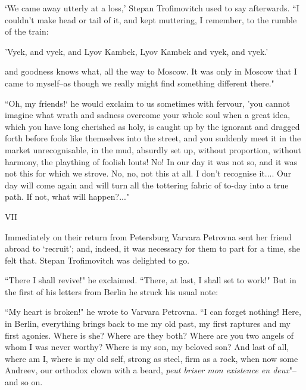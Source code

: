 \documentclass[12pt]{article}
\begin{document}
\vspace{12pt}
`We came away utterly at a loss,' Stepan Trofimovitch used to say
afterwards. ``I couldn't make head or tail of it, and kept muttering, I
remember, to the rumble of the train:


\vspace{12pt}
     'Vyek, and vyek, and Lyov Kambek,
     Lyov Kambek and vyek, and vyek.'


\vspace{12pt}
and goodness knows what, all the way to Moscow. It was only in Moscow
that I came to myself--as though we really might find something
different there."


\vspace{12pt}
``Oh, my friends!` he would exclaim to us sometimes with fervour, 'you
cannot imagine what wrath and sadness overcome your whole soul when a
great idea, which you have long cherished as holy, is caught up by the
ignorant and dragged forth before fools like themselves into the street,
and you suddenly meet it in the market unrecognisable, in the mud,
absurdly set up, without proportion, without harmony, the plaything of
foolish louts! No! In our day it was not so, and it was not this for
which we strove. No, no, not this at all. I don't recognise it.... Our
day will come again and will turn all the tottering fabric of to-day
into a true path. If not, what will happen?..."



\vspace{12pt}
VII


\vspace{12pt}
Immediately on their return from Petersburg Varvara Petrovna sent her
friend abroad to `recruit'; and, indeed, it was necessary for them to
part for a time, she felt that. Stepan Trofimovitch was delighted to go.


\vspace{12pt}
``There I shall revive!" he exclaimed. ``There, at last, I shall set to
work!" But in the first of his letters from Berlin he struck his usual
note:


\vspace{12pt}
``My heart is broken!" he wrote to Varvara Petrovna. ``I can forget
nothing! Here, in Berlin, everything brings back to me my old past, my
first raptures and my first agonies. Where is she? Where are they both?
Where are you two angels of whom I was never worthy? Where is my son, my
beloved son? And last of all, where am I, where is my old self, strong
as steel, firm as a rock, when now some Andreev, our orthodox clown with
a beard, \emph{peut briser mon existence en deux}"--and so on.
\end{document}
